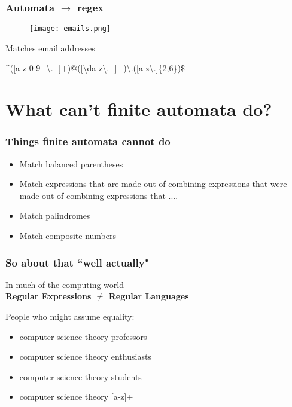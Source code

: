\documentclass{beamer}
\begin{document}
\begin{frame}
	\frametitle{Automata $\rightarrow $ regex}
	\vspace{-0.4in}
	\begin{figure}
	\centering \texttt{[image: emails.png]}
	\end{figure}
	
	\pause
	\vspace{-0.2in}
	Matches email addresses 
	

\string^([a-z 0-9\_\textbackslash. -]$+$)@([\textbackslash da-z\textbackslash. -]$+$)\textbackslash.([a-z\textbackslash.]\{2,6\})\$

\end{frame}


\section*{What can't finite automata do?}

\begin{frame}
\frametitle{Things finite automata cannot do}

\begin{itemize}
\item Match balanced parentheses
\vspace{0.2in}
\item Match expressions that are made out of combining expressions that were made out of combining expressions that ....
\vspace{0.2in}
\item Match palindromes
\vspace{0.2in}
\item Match composite numbers
\end{itemize}

\end{frame}


\begin{frame}
	\frametitle{So about that ``well actually"}
	\begin{center}
In much of the computing world \\
\textbf{Regular Expressions $\neq $ Regular Languages}

	\end{center}
	\vspace{0.2in}
	People who might assume equality:\\
	\begin{itemize}
	\item computer science theory professors
	\item computer science theory enthusiasts
	\item computer science theory students
	\item computer science theory [a-z]+
	\end{itemize}
\end{frame}
\end{document}
